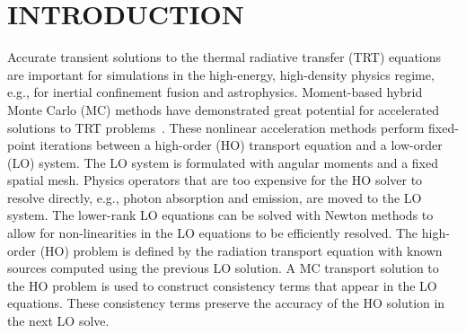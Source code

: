 %
%
%



\pagestyle{plain} %
\setcounter{page}{1}

\chapter{\uppercase {Introduction}}
\label{chp:intro}

Accurate transient solutions to the thermal radiative transfer (TRT) equations are important for
simulations in the
high-energy, high-density physics regime, e.g., for inertial
confinement fusion and astrophysics.  Moment-based hybrid Monte Carlo (MC)
methods have demonstrated great potential for accelerated
solutions to TRT problems~\cite{rmc,bolding_nse,holo_rh}.   These nonlinear acceleration
methods perform fixed-point iterations  between a
high-order (HO) transport equation and a low-order (LO) system. The LO system is
formulated with angular moments and a fixed spatial mesh.  Physics operators that are too
expensive for the HO solver to resolve directly, e.g., photon absorption and emission, are
moved to the LO system. The lower-rank LO equations can be solved with Newton methods to
allow for non-linearities in the LO equations to be efficiently resolved.  The high-order
(HO) problem is defined by the radiation transport equation with known sources computed
using the previous LO solution. A MC transport solution to the HO problem is used to
construct consistency terms that appear in the LO equations. These consistency terms
preserve the accuracy of the HO solution in the next LO solve.

